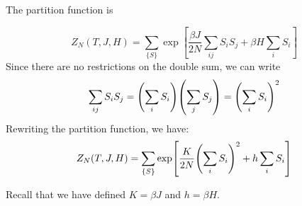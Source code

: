 \documentclass[../main/main.tex]{subfiles}
\begin{document}

The partition function is

\begin{equation}
Z_N (T,J,H) = \sum_{\{ S \}  }^{} \exp [\frac{\beta J}{2N} \sum_{ij}^{} S_i S_j + \beta H \sum_{i}^{} S_i    ]
\end{equation}
Since there are no restrictions on the double sum, we can write
\begin{equation*}
  \sum_{ij}^{} S_i S_j  = \qty(\sum_{i}^{} S_i ) \qty(\sum_{j}^{} S_j )= \qty( \sum_{i}^{} S_i )^2
\end{equation*}
Rewriting the partition function, we have:
\begin{equation}
  Z_N (T,J,H)  =   \sum_{\{ S \}  }^{} \exp  [\frac{K}{2N} \qty( \sum_{i}^{} S_i )^2 + h \sum_{i}^{} S_i    ]
\end{equation}
\begin{remark}
Recall that we have defined \(K=\beta J\) and \( h = \beta H\).
\end{remark}
\end{document}
